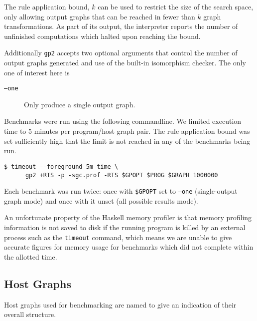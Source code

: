 The rule application bound, $k$ can be used to restrict the size of the search space, only allowing output graphs that can be reached in fewer than $k$ graph transformations. As part of its output, the interpreter reports the number of unfinished computations which halted upon reaching the bound.


Additionally \texttt{gp2} accepts two optional arguments that control the number of output graphs generated and use of the built-in isomorphism checker. The only one of interest here is 

\begin{description}
	\item[\texttt{--one}] Only produce a single output graph.
\end{description}

Benchmarks were run using the following commandline. We limited execution time to 5 minutes per program/host graph pair. The rule application bound was set sufficiently high that the limit is not reached in any of the benchmarks being run.

\begin{verbatim}
$ timeout --foreground 5m time \
      gp2 +RTS -p -sgc.prof -RTS $GPOPT $PROG $GRAPH 1000000
\end{verbatim}

Each benchmark was run twice: once with \texttt{\$GPOPT} set to \texttt{--one} (single-output graph mode) and once with it unset (all possible results mode).

An unfortunate property of the Haskell memory profiler is that memory profiling information is not saved to disk if the running program is killed by an external process such as the \texttt{timeout} command, which means we are unable to give accurate figures for memory usage for benchmarks which did not complete within the allotted time.


\subsection{Host Graphs}
\label{subsec:hosts}

Host graphs used for benchmarking are named to give an indication of their overall structure.

